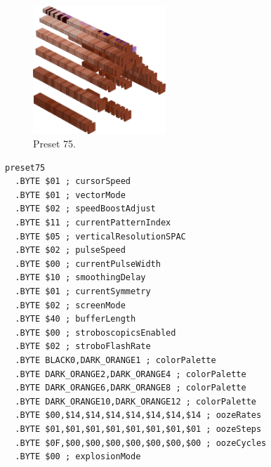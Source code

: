 \clearpage
\begin{minipage}[b]{0.48\linewidth}
\begin{figure}[H]                                                          
  \centering                                                             
  \begin{adjustbox}{width=5cm,center}                                   
  \includegraphics[width=5cm]{src/colorspace_presets/preset75-45.png}%
  \end{adjustbox}                                                        
\caption*{Preset 75.}                                           
\end{figure}                                                               
\end{minipage}
\hspace{0.1cm}
\begin{minipage}[b]{0.48\linewidth}                            
\begin{lstlisting}[basicstyle=\ttfamily\tiny]
preset75
  .BYTE $01 ; cursorSpeed
  .BYTE $01 ; vectorMode
  .BYTE $02 ; speedBoostAdjust
  .BYTE $11 ; currentPatternIndex
  .BYTE $05 ; verticalResolutionSPAC
  .BYTE $02 ; pulseSpeed
  .BYTE $00 ; currentPulseWidth
  .BYTE $10 ; smoothingDelay
  .BYTE $01 ; currentSymmetry
  .BYTE $02 ; screenMode
  .BYTE $40 ; bufferLength
  .BYTE $00 ; stroboscopicsEnabled
  .BYTE $02 ; stroboFlashRate
  .BYTE BLACK0,DARK_ORANGE1 ; colorPalette
  .BYTE DARK_ORANGE2,DARK_ORANGE4 ; colorPalette
  .BYTE DARK_ORANGE6,DARK_ORANGE8 ; colorPalette
  .BYTE DARK_ORANGE10,DARK_ORANGE12 ; colorPalette
  .BYTE $00,$14,$14,$14,$14,$14,$14,$14 ; oozeRates
  .BYTE $01,$01,$01,$01,$01,$01,$01,$01 ; oozeSteps
  .BYTE $0F,$00,$00,$00,$00,$00,$00,$00 ; oozeCycles
  .BYTE $00 ; explosionMode
\end{lstlisting}
\end{minipage}

\vspace*{0.3cm}

